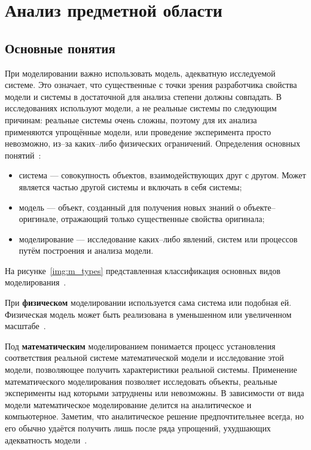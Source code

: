 \chapter{Анализ предметной области}

\section{Основные понятия}

При моделировании важно использовать модель, адекватную исследуемой системе. Это означает, что существенные с точки зрения разработчика свойства модели и системы в достаточной для анализа степени должны совпадать. В исследованиях используют модели, а не реальные системы по следующим причинам: реальные системы очень сложны, поэтому для их анализа применяются упрощённые модели, или проведение эксперимента просто невозможно, из--за каких--либо физических ограничений. Определения основных понятий~\cite{m_types}:
\begin{itemize}[label=---]
	\item система --- совокупность объектов, взаимодействующих друг с другом. Может является частью другой системы и включать в себя системы;
	\item модель --- объект, созданный для получения новых знаний о объекте--оригинале, отражающий только существенные свойства оригинала;
	\item моделирование --- исследование каких--либо явлений, систем или процессов путём построения и анализа модели.
\end{itemize}

На рисунке~\ref{img:m_types} представленная классификация основных видов моделирования~\cite{m_types}.


При \textbf{физическом} моделировании используется сама система или подобная ей. Физическая модель может быть реализована в уменьшенном или увеличенном масштабе~\cite{m_types}.

Под \textbf{математическим} моделированием понимается процесс установления соответствия реальной системе математической модели и исследование этой модели, позволяющее получить характеристики реальной системы. Применение математического моделирования позволяет исследовать объекты, реальные эксперименты над которыми затруднены или невозможны. В зависимости от вида модели математическое моделирование делится на аналитическое и компьютерное. Заметим, что аналитическое решение предпочтительнее всегда, но его обычно удаётся получить лишь после ряда упрощений, ухудшающих адекватность модели~\cite{m_types}.

